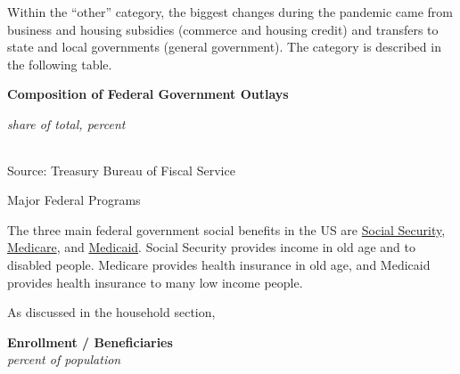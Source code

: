\documentclass{report}
\begin{document}
{\begin{minipage}{0.76\textwidth}
Within the ``other'' category, the biggest changes during the pandemic came from business and housing subsidies (commerce and housing credit) and transfers to state and local governments (general government). The category is described in the following table. 
\vspace{1mm}

\normalsize \textbf{Composition of Federal Government Outlays}\\
\footnotesize{\textit{share of total, percent}
\vspace*{-4mm}

 \setlength{\tabcolsep}{1.2pt} \color{black!90}
{\renewcommand{\arraystretch}{1.55}
\hspace*{-2mm} \begin{tabular}{p{58mm} R{9.0mm} R{9.0mm} R{9.0mm} R{9.0mm} R{9.0mm} R{9.0mm}}
		 \hline
	\end{tabular}
}}
		
\vspace{-2mm}
\footnotesize{Source: Treasury Bureau of Fiscal Service}
\end{minipage}
\newpage
\begin{minipage}{0.76\textwidth}      
\normalsize Major Federal Programs
\vspace{-1mm}

\small The three main federal government social benefits in the US are \href{https://www.ssa.gov/about-ssa}{Social Security}, \href{https://www.medicare.gov/what-medicare-covers/your-medicare-coverage-choices/whats-medicare}{Medicare}, and \href{https://www.medicaid.gov/medicaid/index.html}{Medicaid}. Social Security provides income in old age and to disabled people. Medicare provides health insurance in old age, and Medicaid provides health insurance to many low income people. 

As discussed in the household section,  
\end{minipage}
\vspace{1mm}

\begin{minipage}{0.36\textwidth}
\normalsize \textbf{Enrollment / Beneficiaries}\\
\footnotesize{\textit{percent of population}}
\vspace{4.05cm}


\end{minipage}}
\end{document}
